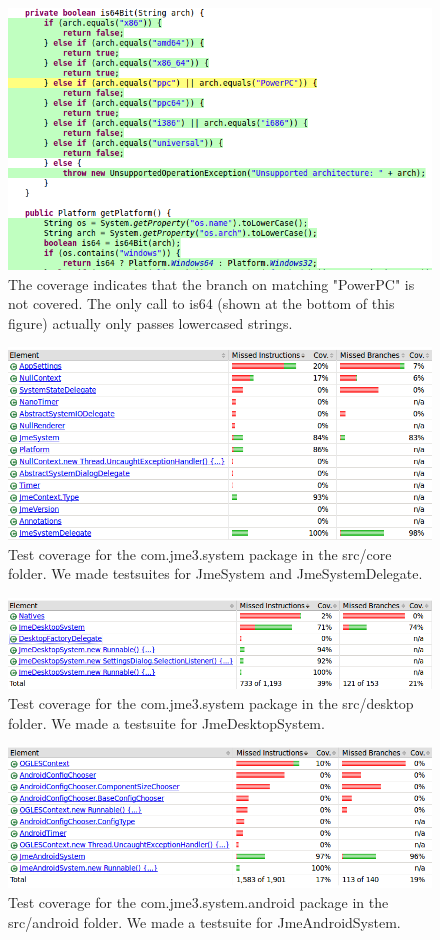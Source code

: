 \documentclass[a4paper, 10pt]{article}
\begin{document}
\begin{figure}[!hb]
\includegraphics[width=\textwidth]{figures/bug-in-delegate.png}
\caption{The coverage indicates that the branch on matching "PowerPC" is not covered. The only call to is64 (shown at the bottom of this figure) actually only passes lowercased strings.}
\label{fig:bug}
\end{figure}

\begin{figure}[!hb]
\includegraphics[width=\textwidth]{figures/test-coverage-core.png}
\caption{Test coverage for the com.jme3.system package in the src/core folder. We made testsuites for JmeSystem and JmeSystemDelegate.}
\label{fig:cov-core}
\end{figure}

\begin{figure}[!hb]
\includegraphics[width=\textwidth]{figures/test-coverage-desktop.png}
\caption{Test coverage for the com.jme3.system package in the src/desktop folder. We made a testsuite for JmeDesktopSystem.}
\label{fig:cov-desktop}
\end{figure}

\begin{figure}
\includegraphics[width=\textwidth]{figures/test-coverage-android.png}
\caption{Test coverage for the com.jme3.system.android package in the src/android folder. We made a testsuite for JmeAndroidSystem.}
\label{fig:cov-android}
\end{figure}
\end{document}
